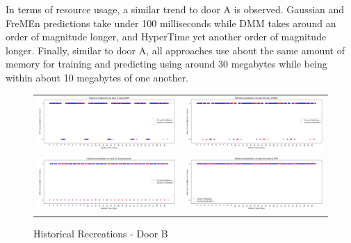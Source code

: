 In terms of resource usage, a similar trend to door A is observed. Gaussian
and FreMEn predictions take under 100 milliseconds while DMM takes around
an order of magnitude longer, and HyperTime yet another order of magnitude
longer. Finally, similar to door A, all approaches use about the same amount
of memory for training and predicting using around 30 megabytes while being
within about 10 megabytes of one another.

\begin{figure}
  \begin{tabular}{cc}
    {\includegraphics[width = 3in]{images/results/Historical_door_B_DMM.png}} &
    {\includegraphics[width = 3in]{images/results/Historical_door_B_FreMEn.png}} \\
    {\includegraphics[width = 3in]{images/results/Historical_door_B_Gaussian.png}} &
    {\includegraphics[width = 3in]{images/results/Historical_door_B_HyT-EM.png}} \\
  \end{tabular}
  \caption{Historical Recreations - Door B}
\end{figure}\\ \\

